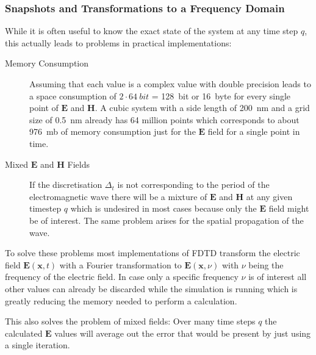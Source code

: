 \subsubsection{Snapshots and Transformations to a Frequency Domain}

While it is often useful to know the exact state of the system at any time step $q$, this actually leads to problems in practical implementations:

\begin{description}
  \item[Memory Consumption] Assuming that each value is a complex value with double precision leads to a space consumption of $2\cdot\SI{64}{bit}$ = \SI{128}{bit} or \SI{16}{byte} for every single point of $\mathbf{E}$ and $\mathbf{H}$. A cubic system with a side length of \SI{200}{nm} and a grid size of \SI{0.5}{nm} already has 64 million points which corresponds to about \SI{976}{mb} of memory consumption just for the $\mathbf{E}$ field for a single point in time.
  \item[Mixed $\mathbf{E}$ and $\mathbf{H}$ Fields] If the discretisation $\Delta_t$ is not corresponding to the period of the electromagnetic wave there will be a mixture of $\mathbf{E}$ and $\mathbf{H}$ at any given timestep $q$ which is undesired in most cases because only the $\mathbf{E}$ field might be of interest. The same problem arises for the spatial propagation of the wave.
\end{description}

To solve these problems most implementations of FDTD transform the electric field $\mathbf{E}(\mathbf{x},t)$ with a Fourier transformation to $\mathbf{E}(\mathbf{x}, \nu)$ with $\nu$ being the frequency of the electric field. In case only a specific frequency $\nu$ is of interest all other values can already be discarded while the simulation is running which is greatly reducing the memory needed to perform a calculation.

This also solves the problem of mixed fields: Over many time steps $q$ the calculated $\mathbf{E}$ values will average out the error that would be present by just using a single iteration.
